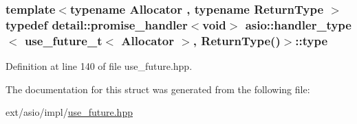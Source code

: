 \subsubsection[{type}]{\setlength{\rightskip}{0pt plus 5cm}template$<$typename Allocator , typename Return\+Type $>$ typedef {\bf detail\+::promise\+\_\+handler}$<$void$>$ {\bf asio\+::handler\+\_\+type}$<$ {\bf use\+\_\+future\+\_\+t}$<$ Allocator $>$, Return\+Type()$>$\+::{\bf type}}\label{structasio_1_1handler__type_3_01use__future__t_3_01_allocator_01_4_00_01_return_type_07_08_4_a398b4ea023b61d222b8070f86d931240}


Definition at line 140 of file use\+\_\+future.\+hpp.



The documentation for this struct was generated from the following file\+:\begin{DoxyCompactItemize}
\item 
ext/asio/impl/\hyperlink{impl_2use__future_8hpp}{use\+\_\+future.\+hpp}\end{DoxyCompactItemize}
